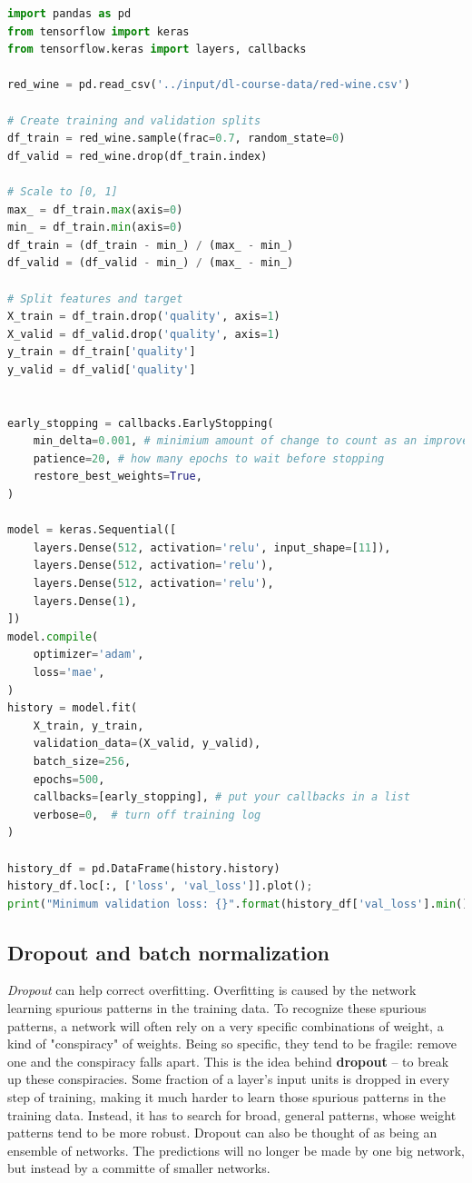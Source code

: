 \begin{lstlisting}[language=Python]
import pandas as pd
from tensorflow import keras
from tensorflow.keras import layers, callbacks

red_wine = pd.read_csv('../input/dl-course-data/red-wine.csv')

# Create training and validation splits
df_train = red_wine.sample(frac=0.7, random_state=0)
df_valid = red_wine.drop(df_train.index)

# Scale to [0, 1]
max_ = df_train.max(axis=0)
min_ = df_train.min(axis=0)
df_train = (df_train - min_) / (max_ - min_)
df_valid = (df_valid - min_) / (max_ - min_)

# Split features and target
X_train = df_train.drop('quality', axis=1)
X_valid = df_valid.drop('quality', axis=1)
y_train = df_train['quality']
y_valid = df_valid['quality']


early_stopping = callbacks.EarlyStopping(
    min_delta=0.001, # minimium amount of change to count as an improvement
    patience=20, # how many epochs to wait before stopping
    restore_best_weights=True,
)

model = keras.Sequential([
    layers.Dense(512, activation='relu', input_shape=[11]),
    layers.Dense(512, activation='relu'),
    layers.Dense(512, activation='relu'),
    layers.Dense(1),
])
model.compile(
    optimizer='adam',
    loss='mae',
)
history = model.fit(
    X_train, y_train,
    validation_data=(X_valid, y_valid),
    batch_size=256,
    epochs=500,
    callbacks=[early_stopping], # put your callbacks in a list
    verbose=0,  # turn off training log
)

history_df = pd.DataFrame(history.history)
history_df.loc[:, ['loss', 'val_loss']].plot();
print("Minimum validation loss: {}".format(history_df['val_loss'].min()))
\end{lstlisting}

\subsection{Dropout and batch normalization}
\noindent \emph{Dropout} can help correct overfitting. Overfitting is caused by the network
learning spurious patterns in the training data. To recognize these spurious patterns, a
network will often rely on a very specific combinations of weight, a kind of "conspiracy"
of weights. Being so specific, they tend to be fragile: remove one and the conspiracy falls
apart. This is the idea behind \textbf{dropout} -- to break up these conspiracies. Some
fraction of a layer's input units is dropped in every step of training, making it much harder
to learn those spurious patterns in the training data. Instead, it has to search for broad,
general patterns, whose weight patterns tend to be more robust. Dropout can also be thought
of as being an ensemble of networks. The predictions will no longer be made by one big
network, but instead by a committe of smaller networks.

